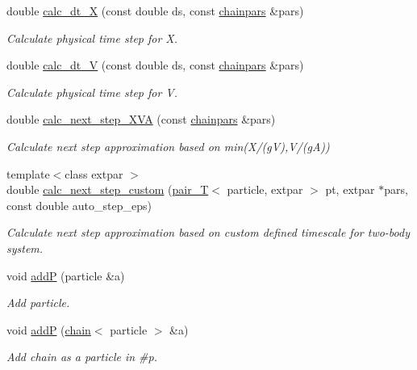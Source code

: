\begin{DoxyCompactItemize}
double \hyperlink{classARC_1_1chain_a4e042a68c8a05c8cd8e233e63e9a8f73}{calc\+\_\+dt\+\_\+X} (const double ds, const \hyperlink{classARC_1_1chainpars}{chainpars} \&pars)
\begin{DoxyCompactList}\small\item\em Calculate physical time step for X. \end{DoxyCompactList}\item 
double \hyperlink{classARC_1_1chain_a4e46df0f8b24f515715d95f6cc871a0d}{calc\+\_\+dt\+\_\+V} (const double ds, const \hyperlink{classARC_1_1chainpars}{chainpars} \&pars)
\begin{DoxyCompactList}\small\item\em Calculate physical time step for V. \end{DoxyCompactList}\item 
double \hyperlink{classARC_1_1chain_a181cc9f8c91d6fb652c17e33d0796306}{calc\+\_\+next\+\_\+step\+\_\+\+X\+VA} (const \hyperlink{classARC_1_1chainpars}{chainpars} \&pars)
\begin{DoxyCompactList}\small\item\em Calculate next step approximation based on min(X/(gV),V/(gA)) \end{DoxyCompactList}\item 
{\footnotesize template$<$class extpar $>$ }\\double \hyperlink{classARC_1_1chain_ac1f7a0b033e9b0302f021f1ecc2a12bc}{calc\+\_\+next\+\_\+step\+\_\+custom} (\hyperlink{namespaceARC_aa489b85f285776ca334a82d85dc0381a}{pair\+\_\+T}$<$ particle, extpar $>$ pt, extpar $\ast$pars, const double auto\+\_\+step\+\_\+eps)
\begin{DoxyCompactList}\small\item\em Calculate next step approximation based on custom defined timescale for two-\/body system. \end{DoxyCompactList}\item 
void \hyperlink{classARC_1_1chain_a0f91c399beb1e5c0db6ed7e2b4d00477}{addP} (particle \&a)
\begin{DoxyCompactList}\small\item\em Add particle. \end{DoxyCompactList}\item 
void \hyperlink{classARC_1_1chain_a22a0c3e8b42954edee0d2f66a27e8640}{addP} (\hyperlink{classARC_1_1chain}{chain}$<$ particle $>$ \&a)
\begin{DoxyCompactList}\small\item\em Add chain as a particle in \#p. \end{DoxyCompactList}\item 

\end{DoxyCompactItemize}
